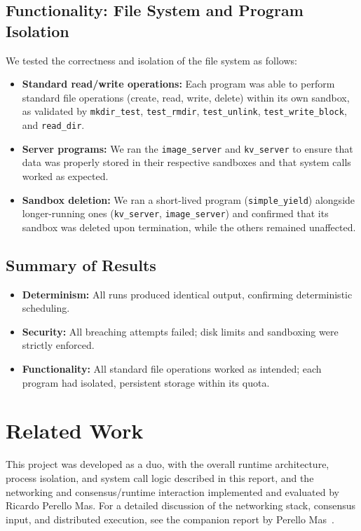 \documentclass[10pt,a4paper,twocolumn]{IEEEtran}
\begin{document}
\subsection{Functionality: File System and Program Isolation}
We tested the correctness and isolation of the file system as follows:
\begin{itemize}
    \item \textbf{Standard read/write operations:} Each program was able to perform standard file operations (create, read, write, delete) within its own sandbox, as validated by \texttt{mkdir\_test}, \texttt{test\_rmdir}, \texttt{test\_unlink}, \texttt{test\_write\_block}, and \texttt{read\_dir}.
    \item \textbf{Server programs:} We ran the \texttt{image\_server} and \texttt{kv\_server} to ensure that data was properly stored in their respective sandboxes and that system calls worked as expected.
    \item \textbf{Sandbox deletion:} We ran a short-lived program (\texttt{simple\_yield}) alongside longer-running ones (\texttt{kv\_server}, \texttt{image\_server}) and confirmed that its sandbox was deleted upon termination, while the others remained unaffected.
\end{itemize}

\subsection{Summary of Results}
\begin{itemize}
    \item \textbf{Determinism:} All runs produced identical output, confirming deterministic scheduling.
    \item \textbf{Security:} All breaching attempts failed; disk limits and sandboxing were strictly enforced.
    \item \textbf{Functionality:} All standard file operations worked as intended; each program had isolated, persistent storage within its quota.
\end{itemize}

\section{Related Work}\label{sec:related}

This project was developed as a duo, with the overall runtime architecture, process isolation, and system call logic described in this report, and the networking and consensus/runtime interaction implemented and evaluated by Ricardo Perello Mas. For a detailed discussion of the networking stack, consensus input, and distributed execution, see the companion report by Perello Mas~\cite{perellomas2025}.
\end{document}
